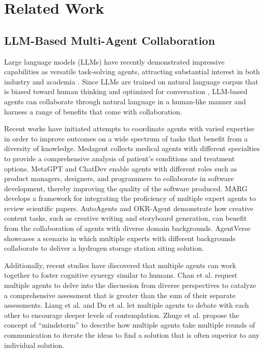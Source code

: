 \section{Related Work}
\subsection{LLM-Based Multi-Agent Collaboration}
Large language models (LLMs) have recently demonstrated impressive capabilities as versatile task-solving agents, attracting substantial interest in both industry and academia \cite{wang2023survey,xi2023rise}. Since LLMs are trained on natural language corpus that is biased toward human thinking \cite{zhuge2023mindstorms} and optimized for conversation \cite{ouyang2022training}, LLM-based agents can collaborate through natural language in a human-like manner and harness a range of benefits that come with collaboration.

Recent works have initiated attempts to coordinate agents with varied expertise in order to improve outcomes on a wide spectrum of tasks that benefit from a diversity of knowledge. Medagent \cite{tang2023MedAgents} collects medical agents with different specialties to provide a comprehensive analysis of patient's conditions and treatment options. MetaGPT \cite{hong2023metagpt} and ChatDev \cite{chetDev} enable agents with different roles such as product managers, designers, and programmers to collaborate in software development, thereby improving the quality of the software produced. MARG\cite{darcy2024marg} develops a framework for integrating the proficiency of multiple expert agents to review scientific papers. AutoAgents\cite{AutoAgents} and OKR-Agent\cite{OKRagents} demonstrate how creative content tasks, such as creative writing and storyboard generation, can benefit from the collaboration of agents with diverse domain backgrounds. 
AgentVerse\cite{chen2023agentverse} showcases a scenario in which multiple experts with different backgrounds collaborate to deliver a hydrogen storage station siting solution. 

Additionally, recent studies have discovered that multiple agents can work together to foster cognitive synergy \cite{luppi2022synergistic} similar to humans. Chan et al. request multiple agents to delve into the discussion from diverse perspectives to catalyze a comprehensive assessment that is greater than the sum of their separate assessments. Liang et al.\cite{Encouraging_Divergent_Thinking_Debate} and Du et al.\cite{du2023improving_debate} let multiple agents to debate with each other to encourage deeper levels of contemplation. Zhuge et al.\cite{zhuge2023mindstorms} propose the concept of ``mindstorm'' to describe how multiple agents take multiple rounds of communication to iterate the ideas to find a solution that is often superior to any individual solution. 

